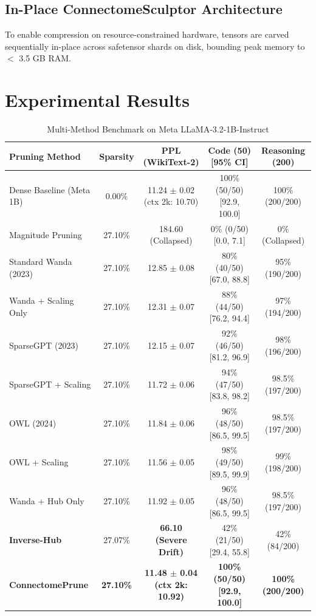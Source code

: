 \documentclass[conference]{IEEEtran}
\begin{document}
\subsection{In-Place ConnectomeSculptor Architecture}
To enable compression on resource-constrained hardware, tensors are carved sequentially in-place across safetensor shards on disk, bounding peak memory to $<$ 3.5 GB RAM.

\section{Experimental Results}

\begin{table}[htbp]
\caption{Multi-Method Benchmark on Meta LLaMA-3.2-1B-Instruct}
\begin{center}
\small
\begin{tabular}{lcccc}
\toprule
\textbf{Pruning Method} & \textbf{Sparsity} & \textbf{PPL (WikiText-2)} & \textbf{Code (50) [95\% CI]} & \textbf{Reasoning (200)} \\
\midrule
Dense Baseline (Meta 1B) & 0.00\% & 11.24 $\pm$ 0.02 (ctx 2k: 10.70) & 100\% (50/50) [92.9, 100.0] & 100\% (200/200) \\
Magnitude Pruning & 27.10\% & 184.60 (Collapsed) & 0\% (0/50) [0.0, 7.1] & 0\% (Collapsed) \\
Standard Wanda (2023) & 27.10\% & 12.85 $\pm$ 0.08 & 80\% (40/50) [67.0, 88.8] & 95\% (190/200) \\
Wanda + Scaling Only & 27.10\% & 12.31 $\pm$ 0.07 & 88\% (44/50) [76.2, 94.4] & 97\% (194/200) \\
SparseGPT (2023) \cite{frantar2023sparsegpt} & 27.10\% & 12.15 $\pm$ 0.07 & 92\% (46/50) [81.2, 96.9] & 98\% (196/200) \\
SparseGPT + Scaling & 27.10\% & 11.72 $\pm$ 0.06 & 94\% (47/50) [83.8, 98.2] & 98.5\% (197/200) \\
OWL (2024) \cite{yin2024owl} & 27.10\% & 11.84 $\pm$ 0.06 & 96\% (48/50) [86.5, 99.5] & 98.5\% (197/200) \\
OWL + Scaling & 27.10\% & 11.56 $\pm$ 0.05 & 98\% (49/50) [89.5, 99.9] & 99\% (198/200) \\
Wanda + Hub Only & 27.10\% & 11.92 $\pm$ 0.05 & 96\% (48/50) [86.5, 99.5] & 98.5\% (197/200) \\
\textbf{Inverse-Hub} & 27.07\% & \textbf{66.10 (Severe Drift)} & 42\% (21/50) [29.4, 55.8] & 42\% (84/200) \\
\midrule
\textbf{ConnectomePrune} & \textbf{27.10\%} & \textbf{11.48 $\pm$ 0.04 (ctx 2k: 10.92)} & \textbf{100\% (50/50) [92.9, 100.0]} & \textbf{100\% (200/200)} \\
\bottomrule
\end{tabular}
\end{center}
\end{table}
\end{document}
